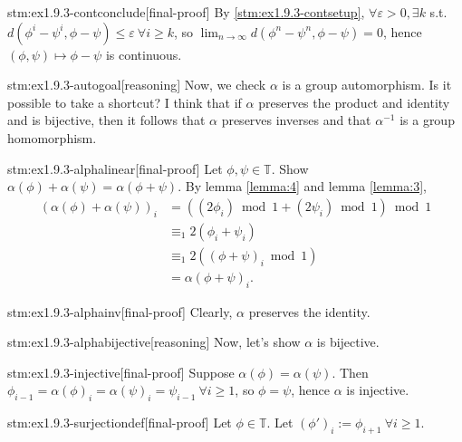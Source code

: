 \begin{stm}{stm:ex1.9.3-contconclude}[final-proof]
By \ref{stm:ex1.9.3-contsetup}, $\forall \varepsilon > 0, \exists k$ s.t. $d(\phi^i - \psi^i, \phi - \psi) \le \varepsilon \ \forall i \ge k$, so $\lim_{n \to \infty} d(\phi^n - \psi^n, \phi - \psi) = 0$, hence $(\phi, \psi) \mapsto \phi - \psi$ is continuous.
\end{stm}

\begin{stm}{stm:ex1.9.3-autogoal}[reasoning]
Now, we check $\alpha$ is a group automorphism. Is it possible to take a shortcut? I think that if $\alpha$ preserves the product and identity and is bijective, then it follows that $\alpha$ preserves inverses and that $\alpha^{-1}$ is a group homomorphism.
\end{stm}

\begin{stm}{stm:ex1.9.3-alphalinear}[final-proof]
    Let $\phi, \psi \in \mathbb{T}$. Show $\alpha(\phi) + \alpha(\psi) = \alpha(\phi + \psi)$. By lemma \ref{lemma:4} and lemma \ref{lemma:3},
    \begin{align*}
    (\alpha(\phi) + \alpha(\psi))_i 
    &= \left((2\phi_i) \bmod 1 + (2\psi_i) \bmod 1\right) \bmod 1 \\
    &\equiv_1 2(\phi_i + \psi_i) \\
    &\equiv_1 2\left((\phi + \psi)_i \bmod 1\right) \\
    &= \alpha(\phi + \psi)_i.
    \end{align*}
\end{stm}

\begin{stm}{stm:ex1.9.3-alphainv}[final-proof]
Clearly, $\alpha$ preserves the identity.
\end{stm}

\begin{stm}{stm:ex1.9.3-alphabijective}[reasoning]
Now, let’s show $\alpha$ is bijective.
\end{stm}

\begin{stm}{stm:ex1.9.3-injective}[final-proof]
Suppose $\alpha(\phi) = \alpha(\psi)$. Then $\phi_{i-1} = \alpha(\phi)_i = \alpha(\psi)_i = \psi_{i-1} \ \forall i \ge 1$, so $\phi = \psi$, hence $\alpha$ is injective.
\end{stm}

\begin{stm}{stm:ex1.9.3-surjectiondef}[final-proof]
Let $\phi \in \mathbb{T}$. Let $(\phi')_i := \phi_{i+1} \ \forall i \ge 1$.
\end{stm}

